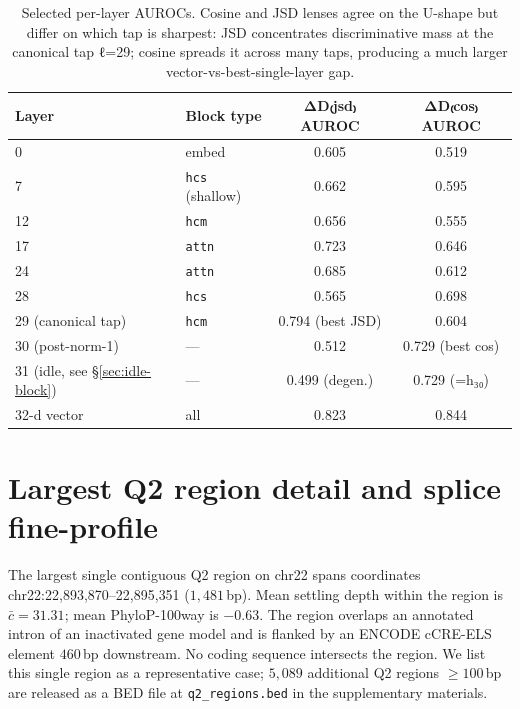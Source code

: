 \documentclass[12pt]{article}
\theoremstyle{plain}
\theoremstyle{definition}
\theoremstyle{remark}
\begin{document}
\begin{table}[h]
\caption{Selected per-layer AUROCs. Cosine and JSD lenses agree on the
U-shape but differ on which tap is sharpest: JSD concentrates
discriminative mass at the canonical tap ℓ=29; cosine spreads it
across many taps, producing a much larger vector-vs-best-single-layer
gap.}
\label{tab:per-layer}
\centering
\small
\begin{tabular}{@{}llcc@{}}
\toprule
Layer & Block type & ΔD₍jsd₎ AUROC & ΔD₍cos₎ AUROC \\
\midrule
0  & embed                    & 0.605 & 0.519 \\
7  & \texttt{hcs} (shallow)   & 0.662 & 0.595 \\
12 & \texttt{hcm}             & 0.656 & 0.555 \\
17 & \texttt{attn}            & 0.723 & 0.646 \\
24 & \texttt{attn}            & 0.685 & 0.612 \\
28 & \texttt{hcs}             & 0.565 & 0.698 \\
29 (canonical tap) & \texttt{hcm}
                                & 0.794 (best JSD) & 0.604 \\
30 (post-norm-1)  & ---     & 0.512 & 0.729 (best cos) \\
31 (idle, see \S\ref{sec:idle-block}) & ---
                                & 0.499 (degen.) & 0.729 (=h₃₀) \\
\midrule
32-d vector & all                 & 0.823 & 0.844 \\
\bottomrule
\end{tabular}
\end{table}

\section{Largest Q2 region detail and splice fine-profile}
\label{app:q2-splice-profile}

The largest single contiguous Q2 region on chr22 spans coordinates
chr22:22{,}893{,}870--22{,}895{,}351 ($1{,}481$\,bp). Mean settling
depth within the region is $\bar c = 31.31$; mean PhyloP-100way is
$-0.63$. The region overlaps an annotated intron of an inactivated gene
model and is flanked by an ENCODE cCRE-ELS element $460$\,bp
downstream. No coding sequence intersects the region. We list this
single region as a representative case; $5{,}089$ additional Q2 regions
$\ge 100$\,bp are released as a BED file at \texttt{q2\_regions.bed} in
the supplementary materials.
\end{document}
